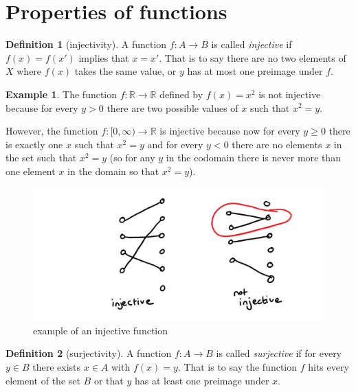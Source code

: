 \documentclass[
]{book}
\theoremstyle{definition}
\newtheorem{definition}{Definition}[chapter]
\theoremstyle{definition}
\newtheorem{example}{Example}[chapter]
\theoremstyle{definition}
\theoremstyle{definition}
\theoremstyle{remark}
\begin{document}
\section{Properties of functions}\label{properties-of-functions}

\begin{definition}[injectivity]
A function \(f:A\rightarrow B\) is called \emph{injective} if \(f(x)=f(x')\) implies that \(x=x'\). That is to say there are no two elements of \(X\) where \(f(x)\) takes the same value, or \(y\) has at most one preimage under \(f\).
\end{definition}

\begin{example}
The function \(f: \mathbb{R} \rightarrow \mathbb{R}\) defined by \(f(x) =x^2\) is not injective because for every \(y>0\) there are two possible values of \(x\) such that \(x^2 = y\).

However, the function \(f: [0, \infty) \rightarrow \mathbb{R}\) is injective because now for every \(y\geq 0\) there is exactly one \(x\) such that \(x^2=y\) and for every \(y <0\) there are no elements \(x\) in the set such that \(x^2 = y\) (so for any \(y\) in the codomain there is never more than one element \(x\) in the domain so that \(x^2 = y\)).
\end{example}

\begin{figure}
\centering
\includegraphics{injective.png}
\caption{\label{fig:unnamed-chunk-2}example of an injective function}
\end{figure}

\begin{definition}[surjectivity]
A function \(f: A \rightarrow B\) is called \emph{surjective} if for every \(y \in B\) there exists \(x \in A\) with \(f(x)=y\). That is to say the function \(f\) hits every element of the set \(B\) or that \(y\) has at least one preimage under \(x\).
\end{definition}
\end{document}
